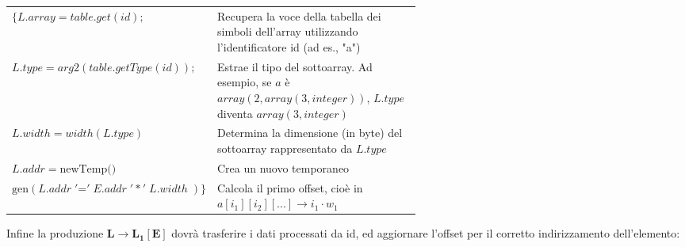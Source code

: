 \documentclass[11pt]{article}
\begin{document}
\begin{center}
\begin{tabularx}{\linewidth}{l m{0.6\linewidth}}
$\{L.array = table.get(id);$ 
    & \small Recupera la voce della tabella dei simboli dell'array utilizzando l'identificatore id (ad es., "a") \\[0.3cm]

$L.type = arg2(table.getType(id));$ 
    & \small Estrae il tipo del sottoarray. Ad esempio, se $a$ è $array(2, array(3, integer))$, $L.type$ diventa $array(3, integer)$ \\[0.3cm]

$L.width = width(L.type)$ 
    & \small Determina la dimensione (in byte) del sottoarray rappresentato da $L.type$ \\[0.3cm]

$L.addr = \text{newTemp()}$ 
    & \small Crea un nuovo temporaneo \\ [0.3cm]

$\text{gen}(L.addr \;'\mathord{=}'\;E.addr \;'*'\; L.width\; )\}$ 
    & \small Calcola il primo offset, cioè in $a[i_1][i_2][...] \rightarrow i_1 \cdot w_1$ \\
\end{tabularx}
\end{center}

\noindent Infine la produzione $\mathbf{L \rightarrow L_1[E] }$ dovrà trasferire i dati processati da id,
ed aggiornare l'offset per il corretto indirizzamento dell'elemento:
\end{document}
